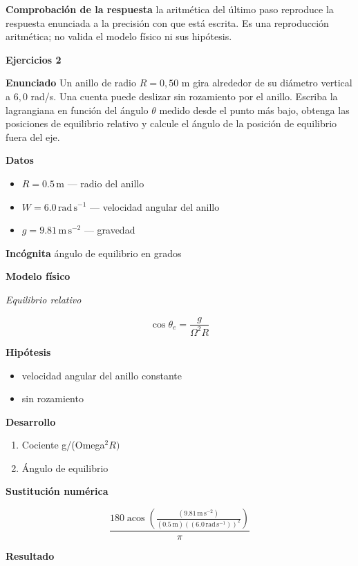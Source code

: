 \documentclass[10pt,openany]{book}
\begin{document}
\noindent\textbf{Comprobación de la respuesta} la aritmética del último paso reproduce la respuesta enunciada a la precisión con que está escrita. Es una reproducción aritmética; no valida el modelo físico ni sus hipótesis.

\noindent\textbf{Ejercicios 2}

\noindent\textbf{Enunciado}
Un anillo de radio \(R = 0{,}50\) m gira alrededor de su diámetro vertical a \(6{,}0\) rad/s. Una cuenta puede deslizar sin rozamiento por el anillo. Escriba la lagrangiana en función del ángulo \(\theta\) medido desde el punto más bajo, obtenga las posiciones de equilibrio relativo y calcule el ángulo de la posición de equilibrio fuera del eje.

\noindent\textbf{Datos}
\begin{itemize}
\item $R = 0.5\,\mathrm{m}$ — radio del anillo
\item $W = 6.0\,\mathrm{rad}\,\mathrm{s}^{-1}$ — velocidad angular del anillo
\item $g = 9.81\,\mathrm{m}\,\mathrm{s}^{-2}$ — gravedad
\end{itemize}

\noindent\textbf{Incógnita}
ángulo de equilibrio en grados

\noindent\textbf{Modelo físico}

\noindent\textit{Equilibrio relativo}

\[
\cos\theta_e = \frac{g}{\Omega^{2}R}
\]

\noindent\textbf{Hipótesis}
\begin{itemize}
\item velocidad angular del anillo constante
\item sin rozamiento
\end{itemize}

\noindent\textbf{Desarrollo}
\begin{enumerate}
\item
Cociente g/(Omega\(^2 R)\)
\item
Ángulo de equilibrio
\end{enumerate}

\noindent\textbf{Sustitución numérica}

\[
\frac{180 \operatorname{acos}{\left(\frac{\left(9.81\,\mathrm{m}\,\mathrm{s}^{-2}\right)}{\left(0.5\,\mathrm{m}\right) \left(\left(6.0\,\mathrm{rad}\,\mathrm{s}^{-1}\right)\right)^{2}} \right)}}{\pi}
\]

\noindent\textbf{Resultado}
\end{document}
